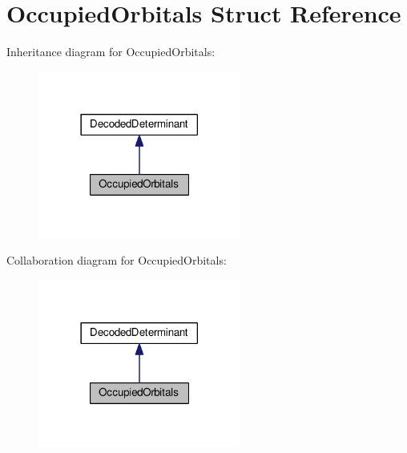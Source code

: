 \hypertarget{structOccupiedOrbitals}{}\section{Occupied\+Orbitals Struct Reference}
\label{structOccupiedOrbitals}


Inheritance diagram for Occupied\+Orbitals\+:\nopagebreak
\begin{figure}[H]
\begin{center}
\leavevmode
\includegraphics[width=189pt]{structOccupiedOrbitals__inherit__graph}
\end{center}
\end{figure}


Collaboration diagram for Occupied\+Orbitals\+:\nopagebreak
\begin{figure}[H]
\begin{center}
\leavevmode
\includegraphics[width=189pt]{structOccupiedOrbitals__coll__graph}
\end{center}
\end{figure}
